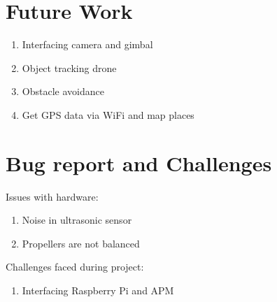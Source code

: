 \documentclass[a4paper,12pt,oneside]{book}
\begin{document}
\section{Future Work}
\begin{enumerate}
    \item Interfacing camera and gimbal
    \item Object tracking drone
    \item Obstacle avoidance
    \item Get GPS data via WiFi and map places
\end{enumerate}

\section{Bug report and Challenges}
Issues with hardware:
\begin{enumerate}
    \item Noise in ultrasonic sensor
    \item Propellers are not balanced
\end{enumerate}
Challenges faced during project:
\begin{enumerate}
    \item Interfacing Raspberry Pi and APM
\end{enumerate}
\end{document}

